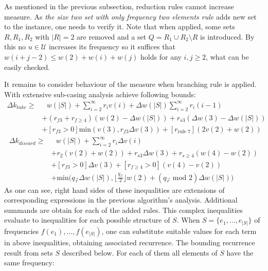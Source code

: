 As mentioned in the previous subsection, reduction rules cannot increase measure. As \textit{the size two set with only frequency two elements rule} adds new set to the instance, one needs to verify it. Note that when applied, some sets $R, R_1, R_2$ with $|R| = 2$ are removed and a set $Q = R_1 \cup R_2 \setminus R$ is introduced. By this no $u\in\mathcal{U}$ increases its frequency so it suffices that $w(i+j-2) \leq w(2) + w(i) + w(j)$ holds for any $i,j \geq 2$, what can be easily checked.
\par It remains to consider behaviour of the measure when branching rule is applied. With extensive sub-casing analysis \citeauthor{VANROOIJ20112147} achieve following bounds:
\begin{equation*}
    \begin{split}
        \Delta k_{take} \geq 
        &\text{ } w(|S|) + \sum_{i = 2}^\infty r_i v(i) + \Delta w(|S|)\sum_{i = 2}^\infty r_i(i - 1) \\
        &+ (r_{f3} + r_{f\geq 4})(w(2) - \Delta w(|S|)) + r_{s3}(\Delta w(3) - \Delta w(|S|)) \\
        &+ [r_{f3} > 0] \text{min}(v(3), r_{f3} \Delta v(3)) + [r_{\text{rule 7}}](2v(2) + w(2))
    \end{split}
\end{equation*}
\begin{equation*}
    \begin{split}
        \Delta k_{discard} \geq
        &\text{ } w(|S|) + \sum_{i = 2}^\infty r_i \Delta v(i) \\
        &+ r_2(v(2) + w(2)) + r_{s3} \Delta w(3) + r_{s\geq 4}(w(4) - w(2))\\
        & + [r_{f3} > 0]\Delta v(3) + [r_{f\geq 4} > 0](v(4) - v(2)) \\
        & + \text{min} \Big(q_{\vec{r}}\Delta w(|S|), \lfloor \frac{q_{\vec{r}}}{2}\rfloor w(2) + (q_{\vec{r}} \text{ mod } 2) \Delta w(|S|)\Big) 
    \end{split}
\end{equation*}
As one can see, right hand sides of these inequalities are extensions of corresponding expressions in the previous algorithm's analysis. Additional summands are obtain for each of the added rules. This complex inequalities evaluate to inequalities for each possible structure of $S$. When $S = \{ e_1, \dots, e_{|S|}\}$ of frequencies $f(e_1), \dots, f(e_{|S|})$, one can substitute suitable values for each term in above inequalities, obtaining associated recurrence. 
The bounding recurrence result from sets $S$ described below. For each of them all elements of $S$ have the same frequency: 
